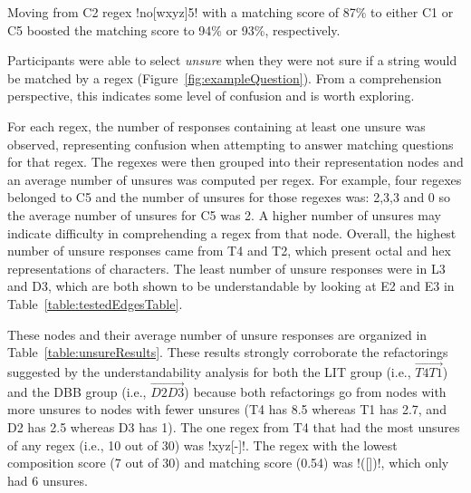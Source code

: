 Moving from C2 regex \cverb!no[wxyz]5! with a matching score of 87\% to either C1 or C5 boosted the matching score to 94\% or 93\%, respectively.


Participants were able to select \emph{unsure} when they were not sure if a string would be matched by a regex (Figure~\ref{fig:exampleQuestion}). From a comprehension perspective, this indicates some level of confusion and is worth exploring.



For each regex, the number of responses containing at least one unsure was observed, representing confusion when attempting to answer matching questions for that regex.
The regexes were then grouped into their representation nodes and an average number of unsures was computed per regex.  For example, four regexes belonged to C5 and the number of unsures for those regexes was: 2,3,3 and 0 so the average number of unsures for C5 was 2.
A higher number of unsures may indicate difficulty in comprehending a regex from that node.
Overall, the highest number of unsure responses came from T4 and T2, which present octal and hex representations of characters. The least number of unsure responses were in L3 and D3, which are both shown to be understandable by looking at E2 and E3 in Table~\ref{table:testedEdgesTable}.

These nodes and their average number of unsure responses are organized in Table~\ref{table:unsureResults}.
These results strongly corroborate the refactorings suggested by the understandability analysis for both the LIT group (i.e., $\overrightarrow{T4 T1}$) and the DBB group (i.e.,  $\overrightarrow{D2 D3}$) because both refactorings go from nodes with more unsures to nodes with fewer unsures (T4 has 8.5 whereas T1 has 2.7, and D2 has 2.5 whereas D3 has 1).
The one regex from T4 that had the most unsures of any regex (i.e., 10 out of 30) was \cverb!xyz[-]!.  The regex with the lowest composition score (7 out of 30) and matching score (0.54) was \cverb!([])!, which only had 6 unsures.
